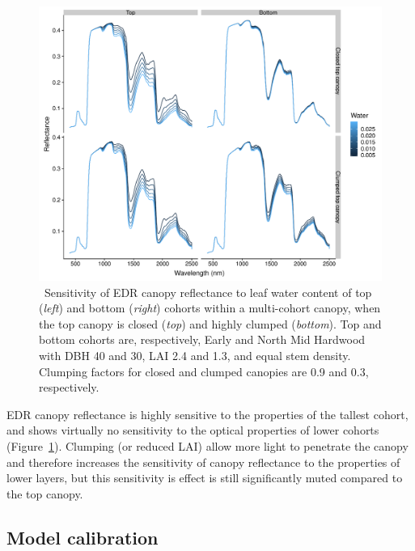 \begin{figure}
  \centering
  \includegraphics[width=\textwidth]{4_edr/figures/explore_spectra/edr_sensitivity_double.pdf}
  \caption{\
    Sensitivity of EDR canopy reflectance to leaf water content of top (\textit{left}) and bottom (\textit{right}) cohorts within a multi-cohort canopy,
    when the top canopy is closed (\textit{top}) and highly clumped (\textit{bottom}).
    Top and bottom cohorts are, respectively, Early and North Mid Hardwood with DBH 40 and 30, LAI 2.4 and 1.3, and equal stem density.
    Clumping factors for closed and clumped canopies are 0.9 and 0.3, respectively.
  }\label{fig:sensitivity_water_multi}
\end{figure}

EDR canopy reflectance is highly sensitive to the properties of the tallest cohort, and shows virtually no sensitivity to the optical properties of lower cohorts (Figure~\ref{fig:sensitivity_water_multi}).
Clumping (or reduced LAI) allow more light to penetrate the canopy and therefore increases the sensitivity of canopy reflectance to the properties of lower layers, but this sensitivity is effect is still significantly muted compared to the top canopy.


\subsection{Model calibration}

